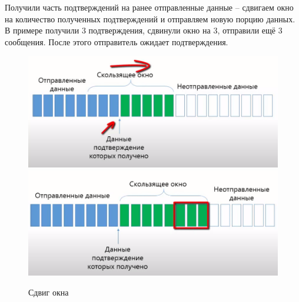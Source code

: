 Получили часть подтверждений на ранее отправленные данные -- сдвигаем окно на количество полученных подтверждений и отправляем новую порцию данных. В примере получили 3 подтверждения, сдвинули окно на 3, отправили ещё 3 сообщения. После этого отправитель ожидает подтверждения.

\begin{figure}[H] \centering
	\includegraphics[scale = 0.4]{18/window_2.png}
	\includegraphics[scale = 0.4]{18/window_3.png}
	\caption{Сдвиг окна}
\end{figure}
